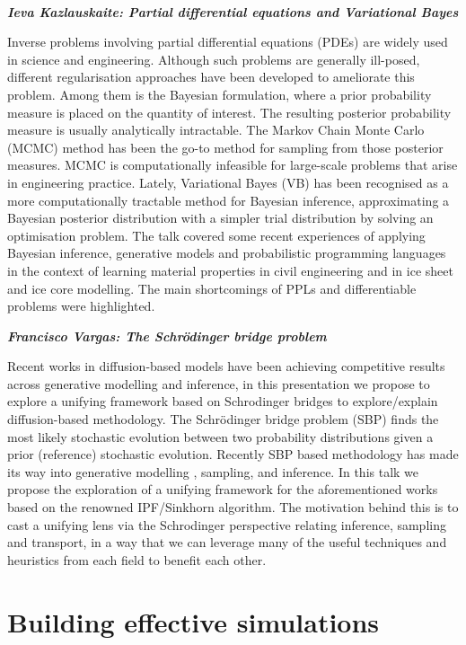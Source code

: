 ~

\emph{\textbf{Ieva Kazlauskaite: Partial differential equations and
Variational Bayes}}

Inverse problems involving partial differential equations (PDEs) are
widely used in science and engineering. Although such problems are
generally ill-posed, different regularisation approaches have been
developed to ameliorate this problem. Among them is the Bayesian
formulation, where a prior probability measure is placed on the quantity
of interest. The resulting posterior probability measure is usually
analytically intractable. The Markov Chain Monte Carlo (MCMC) method has
been the go-to method for sampling from those posterior measures. MCMC
is computationally infeasible for large-scale problems that arise in
engineering practice. Lately, Variational Bayes (VB) has been recognised
as a more computationally tractable method for Bayesian inference,
approximating a Bayesian posterior distribution with a simpler trial
distribution by solving an optimisation problem. The talk covered some
recent experiences of applying Bayesian inference, generative models and
probabilistic programming languages in the context of learning material
properties in civil engineering and in ice sheet and ice core modelling.
The main shortcomings of PPLs and differentiable problems were
highlighted.~

\emph{\textbf{Francisco Vargas: The Schrödinger bridge problem}}

Recent works in diffusion-based models have been achieving competitive
results across generative modelling and inference, in this presentation
we propose to explore a unifying framework based on Schrodinger bridges
to explore/explain diffusion-based methodology. The Schrödinger bridge
problem (SBP) finds the most likely stochastic evolution between two
probability distributions given a prior (reference) stochastic
evolution. Recently SBP based methodology has made its way into
generative modelling , sampling, and inference. In this talk we propose
the exploration of a unifying framework for the aforementioned works
based on the renowned IPF/Sinkhorn algorithm. The motivation behind this
is to cast a unifying lens via the Schrodinger perspective relating
inference, sampling and transport, in a way that we can leverage many of
the useful techniques and heuristics from each field to benefit each
other.

\hypertarget{building-effective-simulations}{%
\section{Building effective
simulations}\label{building-effective-simulations}}

